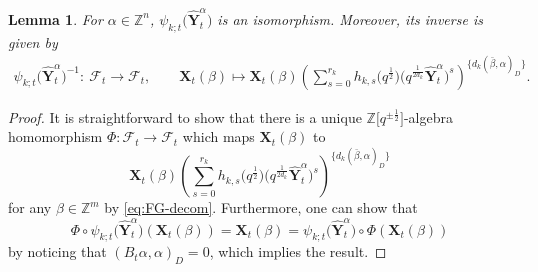 \documentclass[10pt,a4paper]{amsart}
\newcommand{\Z}{\mathbb{Z}}
\numberwithin{equation}{section}
\newtheorem{Lemma}[Theorem]{Lemma}
\begin{document}
\begin{Lemma}
 For $\alpha\in \Z^n$, $\psi_{k;t}\bigl(\mathbf{\hat{Y}}_{t}^{\alpha}\bigr)$ is an isomorphism. Moreover, its inverse is given by
 \begin{align*}
 \psi_{k;t}\bigl(\mathbf{\hat{Y}}_{t}^{\alpha}\bigr)^{-1}\colon\ \mathcal{F}_t\to \mathcal{F}_t,\qquad
 \mathbf{X}_{t}(\beta)\mapsto\mathbf{X}_{t}(\beta)\left(\sum\limits_{s=0}^{r_k} h_{k,s}\bigl(q^{\frac{1}{2}}\bigr)\bigl(q^{\frac{1}{2d_{k}}}\mathbf{\hat{Y}}_{t}^{\alpha}\bigr)^{s}\right)^{\{d_{k}(\bar{\beta},\alpha)_D\}}.
\end{align*}
\end{Lemma}
\begin{proof}
 It is straightforward to show that there is a unique $\Z\big[q^{\pm\frac{1}{2}}\big]$-algebra homomorphism $\Phi\colon \mathcal{F}_t\to \mathcal{F}_t$ which maps $\mathbf{X}_t(\beta)$ to
 \[
 \mathbf{X}_{t}(\beta)\left(\sum\limits_{s=0}^{r_k} h_{k,s}\bigl(q^{\frac{1}{2}}\bigr)\bigl(q^{\frac{1}{2d_{k}}}\mathbf{\hat{Y}}_{t}^{\alpha}\bigr)^{s}\right)^{\{d_{k}(\bar{\beta},\alpha)_D\}}
 \]
  for any $\beta\in \Z^m$ by \eqref{eq:FG-decom}.
 Furthermore, one can show that
 \[
 \Phi\circ \psi_{k;t}\bigl(\mathbf{\hat{Y}}_{t}^{\alpha}\bigr)(\mathbf{X}_t(\beta))=\mathbf{X}_t(\beta)=\psi_{k;t}\bigl(\mathbf{\hat{Y}}_{t}^{\alpha}\bigr)\circ \Phi(\mathbf{X}_t(\beta))
 \]
 by noticing that $(B_t\alpha, \alpha)_D=0$, which implies the result.
\end{proof}
\end{document}
